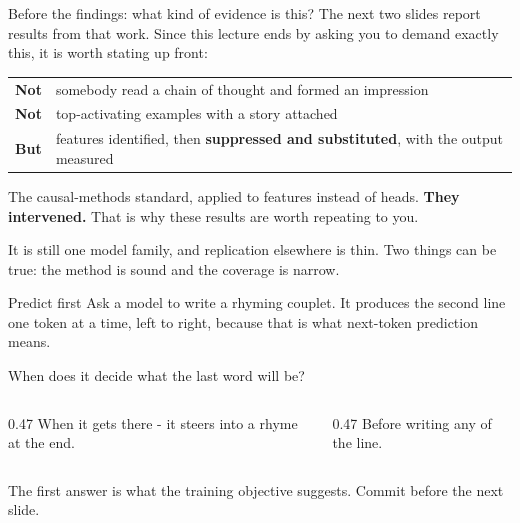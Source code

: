 \documentclass[aspectratio=169]{beamer}
\newcommand{\takebox}[1]{%
  \begin{tcolorbox}[colback=paramgreen!8, colframe=paramgreen, boxrule=0.6pt, arc=2pt]
  #1
  \end{tcolorbox}}
\begin{document}
\begin{frame}{Before the findings: what kind of evidence is this?}
  \vspace{0.8em}
  The next two slides report results from that work. Since this lecture ends by asking you to
  demand exactly this, it is worth stating up front:

  \vspace{0.9em}
  \begin{center}
  \small
  \begin{tabular}{@{}ll@{}}
    \toprule
    \textbf{Not} & somebody read a chain of thought and formed an impression\\[0.4em]
    \textbf{Not} & top-activating examples with a story attached\\[0.4em]
    \textbf{But} & features identified, then \textbf{suppressed and substituted}, with the
      output measured\\
    \bottomrule
  \end{tabular}
  \end{center}

  \vspace{1.0em}
  \takebox{The causal-methods standard, applied to features instead of heads. \textbf{They
  intervened.} That is why these results are worth repeating to you.}

  \vspace{0.6em}
  {\footnotesize It is still one model family, and replication elsewhere is thin. Two things can
  be true: the method is sound and the coverage is narrow.}
\end{frame}

\begin{frame}{Predict first}
  \vspace{1.0em}
  Ask a model to write a rhyming couplet. It produces the second line one token at a time, left
  to right, because that is what next-token prediction means.

  \vspace{1.3em}
  \begin{center}
    {\large When does it decide what the last word will be?}
  \end{center}

  \vspace{1.3em}
  \begin{columns}[T]
    \begin{column}{0.47\textwidth}
      \centering When it gets there - it steers into a rhyme at the end.
    \end{column}
    \begin{column}{0.47\textwidth}
      \centering Before writing any of the line.
    \end{column}
  \end{columns}

  \vspace{1.2em}
  \begin{center}
    {\footnotesize The first answer is what the training objective suggests. Commit before the
    next slide.}
  \end{center}
\end{frame}
\end{document}
